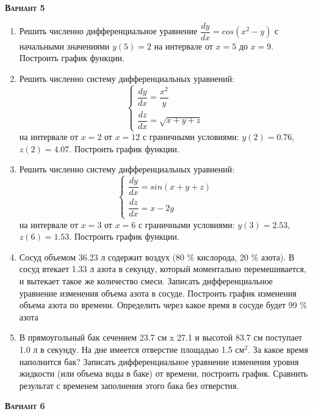 \textsc{\textbf{Вариант 5}}
\begin{enumerate}
\item Решить численно дифференциальное уравнение $\dfrac{dy}{dx}=cos(x^2-y)             $ с начальными значениями $y(     5)=     2$ на интервале от $x=     5$ до $x=     9$. Построить график функции.\item Решить численно систему дифференциальных уравнений:
 \begin{equation*}
\left\{
\begin{gathered}
\dfrac{dy}{dx}=\dfrac{x^2}{y}        \\
\dfrac{dz}{dx}=\sqrt{x+y+z}          
\end{gathered}
\right.
\end{equation*}
на интервале от $x= 2$ от $x=12$ с граничными условиями: $y( 2)=0.76$, $z( 2)=4.07$. Построить график функции. 
\item Решить численно систему дифференциальных уравнений:
 \begin{equation*}
\left\{
\begin{gathered}
\dfrac{dy}{dx}=sin(x+y+z)\\
\dfrac{dz}{dx}=x-2y
\end{gathered}
\right.
\end{equation*}
на интервале от $x= 3$ от $x= 6$ с граничными условиями: $y( 3)=2.53$, $z( 6)=1.53$.  Построить график функции. 
\item  Сосуд объемом 36.23 л содержит воздух (80 \% кислорода, 20 \% азота). В сосуд втекает 1.33 л азота в секунду, который моментально перемешивается, и вытекает такое же количество смеси. Записать дифференциальное уравнение изменения объема азота в сосуде. Построить график изменения объема азота по времени. Определить через какое время в сосуде будет 99 \% азота

\item  В прямоугольный бак сечением 23.7 см x 27.1 и высотой 83.7 см поступает 1.0 л в секунду. На дне имеется отверстие площадью 1.5 $\text{см}^2$. За какое время наполнится бак? Записать  дифференциальное уравнение изменения уровня жидкости (или объема воды в баке) от времени, построить график. Сравнить результат с временем заполнения этого бака без отверстия.

 \end{enumerate}
\textsc{\textbf{Вариант 6}}
